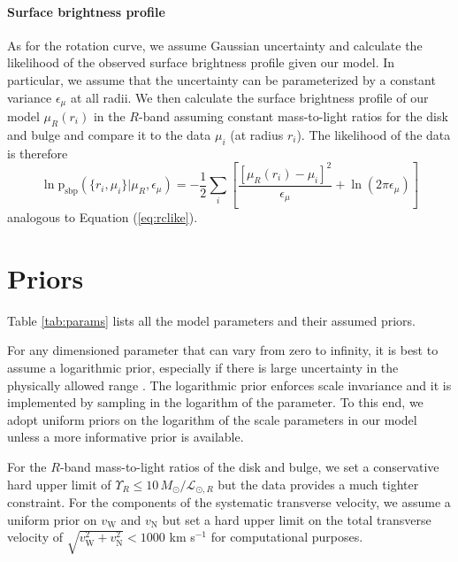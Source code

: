 \documentclass[preprint]{aastex}
\newcommand{\Tab}[1]{Table \ref{tab:#1}}
\newcommand{\eqlabel}[1]{\label{eq:#1}}
\newcommand{\eq}[1]{Equation (\ref{eq:#1})}
\begin{document}
\paragraph{Surface brightness profile}

As for the rotation curve, we assume Gaussian uncertainty and calculate the
likelihood of the observed surface brightness profile given our model.  In
particular, we assume that the uncertainty can be parameterized by a constant
variance $\epsilon_\mu$ at all radii.  We then calculate the surface brightness
profile of our model $\mu_R (r_i)$ in the $R$-band assuming constant
mass-to-light ratios for the disk and bulge and compare it to the data
$\mu_i$ (at radius $r_i$).  The likelihood of the data is therefore
\begin{equation}
    \eqlabel{sbpprob}
    \ln \mathrm{p}_\mathrm{sbp} (\{ r_i, \mu_i \} | \mu_R,\epsilon_\mu )
    = - \frac{1}{2} \sum_i \left [ \frac{\left [ \mu_R (r_i) - \mu_i \right ]^2 }
        {\epsilon_\mu} + \ln (2 \pi \epsilon_\mu) \right ]
\end{equation}
analogous to \eq{rclike}.



\section{Priors}

\label{sect:priors}

\Tab{params} lists all the model parameters and their assumed priors.

For any dimensioned parameter that can vary from zero to infinity, it is best to
assume a logarithmic prior, especially if there is large uncertainty in the
physically allowed range \citep{Gregory:2005}.  The logarithmic prior enforces
scale invariance and it is implemented by sampling in the logarithm of the parameter.
To this end, we adopt uniform priors on the logarithm of the scale parameters in
our model unless a more informative prior is available.

For the $R$-band mass-to-light ratios of the disk and bulge, we set a conservative
hard upper limit of $\Upsilon_R \le 10 \, M_\odot /\mathcal{L}_{\odot,R}$ but
the data provides a much tighter constraint.  For the components of the systematic
transverse velocity, we assume a uniform prior on $v_\mathrm{W}$ and $v_\mathrm{N}$
but set a hard upper limit on the total transverse velocity of
$\sqrt{v_\mathrm{W}^2+v_\mathrm{N}^2} < 1000$ km s$^{-1}$ for computational purposes.
\end{document}
